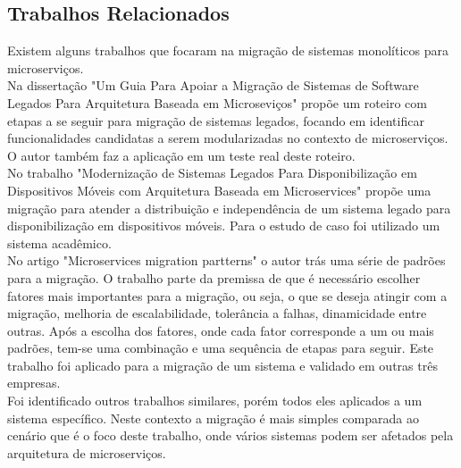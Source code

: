 \documentclass[12pt]{article}
\begin{document}
\subsection{Trabalhos Relacionados}
Existem alguns trabalhos que focaram na migração de sistemas monolíticos para microserviços.
\\Na dissertação "Um Guia Para Apoiar a Migração de Sistemas de Software Legados Para Arquitetura Baseada em Microseviços"\hspace{0.05cm} \cite{Silva2018} propõe um roteiro com etapas a se seguir para migração de sistemas legados, focando em identificar funcionalidades candidatas a serem modularizadas no contexto de microserviços. O autor também faz a aplicação em um teste real deste roteiro.
\\No trabalho "Modernização de Sistemas Legados Para Disponibilização em Dispositivos Móveis com Arquitetura Baseada em Microservices"\hspace{0.05cm} \cite{Freitas} propõe uma migração para atender a distribuição e independência de um sistema legado para disponibilização em dispositivos móveis. Para o estudo de caso foi utilizado um sistema acadêmico.
\\No artigo "Microservices migration partterns" o autor \cite{Balalaie2018} trás uma série de padrões para a migração. O trabalho parte da premissa de que é necessário escolher fatores mais importantes para a migração, ou seja, o que se deseja atingir com a migração, melhoria de escalabilidade, tolerância a falhas, dinamicidade entre outras. Após a escolha dos fatores, onde cada fator corresponde a um ou mais padrões, tem-se uma combinação e uma sequência de etapas para seguir. Este trabalho foi aplicado para a migração de um sistema e validado em outras três empresas.
\\Foi identificado outros trabalhos similares, porém todos eles aplicados a um sistema específico. Neste contexto a migração é mais simples comparada ao cenário que é o foco deste trabalho, onde vários sistemas podem ser afetados pela arquitetura de microserviços.
\end{document}
